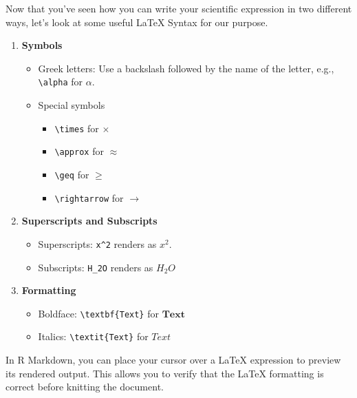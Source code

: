 \documentclass[
]{book}
\providecommand{\tightlist}{%
  \setlength{\itemsep}{0pt}\setlength{\parskip}{0pt}}
\begin{document}
Now that you've seen how you can write your scientific expression in two different ways, let's look at some useful LaTeX Syntax for our purpose.

\begin{enumerate}
\def\labelenumi{\arabic{enumi}.}
\tightlist
\item
  \textbf{Symbols}

  \begin{itemize}
  \tightlist
  \item
    Greek letters: Use a backslash followed by the name of the letter, e.g., \texttt{\textbackslash{}alpha} for \(\alpha\).
  \item
    Special symbols

    \begin{itemize}
    \tightlist
    \item
      \texttt{\textbackslash{}times} for \(\times\)
    \item
      \texttt{\textbackslash{}approx} for \(\approx\)
    \item
      \texttt{\textbackslash{}geq} for \(\geq\)
    \item
      \texttt{\textbackslash{}rightarrow} for \(\rightarrow\)
    \end{itemize}
  \end{itemize}
\item
  \textbf{Superscripts and Subscripts}

  \begin{itemize}
  \tightlist
  \item
    Superscripts: \texttt{x\^{}2} renders as \(x^2\).
  \item
    Subscripts: \texttt{H\_2O} renders as \(H_2O\)
  \end{itemize}
\item
  \textbf{Formatting}

  \begin{itemize}
  \tightlist
  \item
    Boldface: \texttt{\textbackslash{}textbf\{Text\}} for \(\textbf{Text}\)
  \item
    Italics: \texttt{\textbackslash{}textit\{Text\}} for \(\textit{Text}\)
  \end{itemize}
\end{enumerate}

In R Markdown, you can place your cursor over a LaTeX expression to preview its rendered output. This allows you to verify that the LaTeX formatting is correct before knitting the document.
\end{document}

